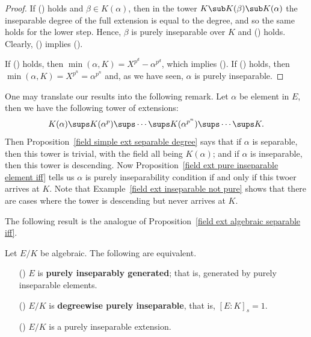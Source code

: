 \begin{proof}
If () holds and $\beta\in K(\alpha)$, then in the tower $K\sub K(\beta)\sub K(\alpha)$ the inseparable degree of the full extension is equal to the degree, and so the same holds for the lower step. Hence, $\beta$ is purely inseparable over $K$ and () holds. Clearly, () implies ().\par
If () holds, then $\min(\alpha,K)=X^{p^d}-\alpha^{p^d}$, which implies (). If () holds, then $\min(\alpha,K)=X^{p^n}=\alpha^{p^n}$ and, as we have seen, $\alpha$ is purely inseparable.
\end{proof}
One may translate our results into the following remark. Let $\alpha$ be  element in $E$, then we have the following tower of extensions:
\[K(\alpha)\sups K(\alpha^p)\sups\cdots\sups K(\alpha^{p^n})\sups\cdots\sups K.\]
Then Proposition~\ref{field simple ext separable degree} says that if $\alpha$ is separable, then this tower is trivial, with the field all being $K(\alpha)$; and if $\alpha$ is inseparable, then this tower is descending. Now Proposition~\ref{field ext pure inseparable element iff} tells us $\alpha$ is purely inseparability condition if and only if this twoer arrives at $K$. Note that Example~\ref{field ext inseparable not pure} shows that there are cases where the tower is descending but never arrives at $K$.\par
The following result is the analogue of Proposition~\ref{field ext algebraic separable iff}.
\begin{proposition}\label{field ext algebraic purely inseparable iff}
Let $E/K$ be algebraic. The following are equivalent.
\begin{itemize}
\item[(\rmnum{1})] $E$ is \textbf{purely inseparably generated}; that is, generated by purely inseparable elements.
\item[(\rmnum{2})] $E/K$ is \textbf{degreewise purely inseparable}, that is, $[E:K]_s=1$.
\item[(\rmnum{3})] $E/K$ is a purely inseparable extension.  
\end{itemize}
\end{proposition}
